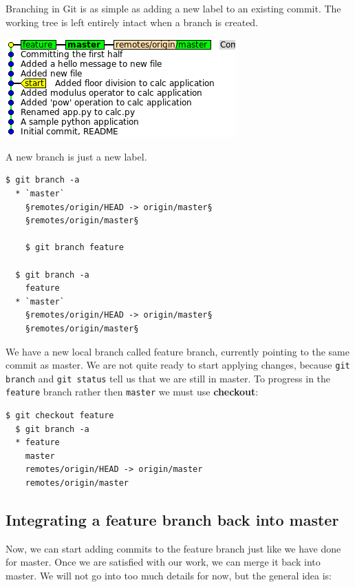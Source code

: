 \documentclass{tufte-handout}
\begin{document}
Branching in Git is as simple as adding a new label to an existing commit.
The working tree is left entirely intact when a branch is created.
\begin{marginfigure}%
  \centering
  \includegraphics[width=\linewidth]{gitbranch-feature.png}
  \label{fig:gitbranch-feature}
  \caption{A new branch is just a new label.}
\end{marginfigure}
\begin{lstlisting}[style=BashInputStyle]
  $ git branch -a
  * `master`
    §remotes/origin/HEAD -> origin/master§
    §remotes/origin/master§

    $ git branch feature

  $ git branch -a
    feature
  * `master`
    §remotes/origin/HEAD -> origin/master§
    §remotes/origin/master§
\end{lstlisting}

We have a new local branch called feature branch, currently pointing to the same commit as master.
We are not quite ready to start applying changes, because \texttt{git branch} and \texttt{git status} tell us that we are still in master.
To progress in the \texttt{feature} branch rather then \texttt{master} we must use \textbf{checkout}:

\begin{lstlisting}[style=BashInputStyle]
  $ git checkout feature
  $ git branch -a
  * feature
    master
    remotes/origin/HEAD -> origin/master
    remotes/origin/master
\end{lstlisting}

\subsection{Integrating a feature branch back into master}

Now, we can start adding commits to the feature branch just like we have done for master.
Once we are satisfied with our work, we can merge it back into master.
We will not go into too much details for now, but the general idea is:
\end{document}
